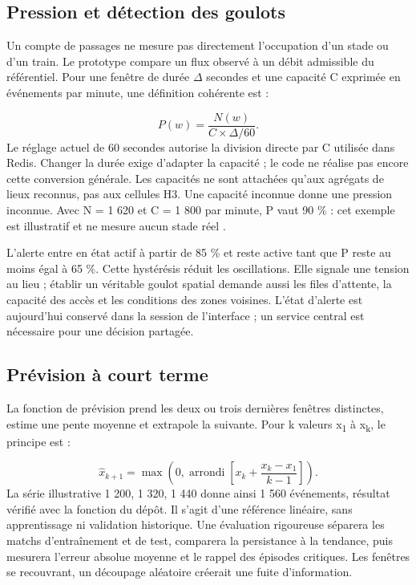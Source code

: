 \documentclass[a4paper,11pt]{article}
\begin{document}
\subsection{Pression et détection des goulots}
Un compte de passages ne mesure pas directement l'occupation d'un stade ou d'un train. Le prototype compare un flux observé à un débit admissible du référentiel. Pour une fenêtre de durée \(\Delta\) secondes et une capacité C exprimée en événements par minute, une définition cohérente est :
\par
\[P(w)=\frac{N(w)}{C\times\Delta/60}.\]
Le réglage actuel de 60 secondes autorise la division directe par C utilisée dans Redis. Changer la durée exige d'adapter la capacité ; le code ne réalise pas encore cette conversion générale. Les capacités ne sont attachées qu'aux agrégats de lieux reconnus, pas aux cellules H3. Une capacité inconnue donne une pression inconnue. Avec N = 1 620 et C = 1 800 par minute, P vaut 90 \% : cet exemple est illustratif et ne mesure aucun stade réel \cite{ref2}.
\par
L'alerte entre en état actif à partir de 85 \% et reste active tant que P reste au moins égal à 65 \%. Cette hystérésis réduit les oscillations. Elle signale une tension au lieu ; établir un véritable goulot spatial demande aussi les files d'attente, la capacité des accès et les conditions des zones voisines. L'état d'alerte est aujourd'hui conservé dans la session de l'interface ; un service central est nécessaire pour une décision partagée.
\par
\subsection{Prévision à court terme}
La fonction de prévision prend les deux ou trois dernières fenêtres distinctes, estime une pente moyenne et extrapole la suivante. Pour k valeurs x\textsubscript{1} à x\textsubscript{k}, le principe est :
\par
\[\widehat{x}_{k+1}=\max\!\left(0,\operatorname{arrondi}\!\left[x_k+\frac{x_k-x_1}{k-1}\right]\right).\]
La série illustrative 1 200, 1 320, 1 440 donne ainsi 1 560 événements, résultat vérifié avec la fonction du dépôt. Il s'agit d'une référence linéaire, sans apprentissage ni validation historique. Une évaluation rigoureuse séparera les matchs d'entraînement et de test, comparera la persistance à la tendance, puis mesurera l'erreur absolue moyenne et le rappel des épisodes critiques. Les fenêtres se recouvrant, un découpage aléatoire créerait une fuite d'information.
\par
\end{document}
